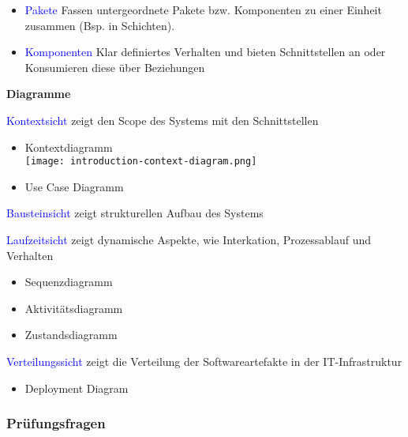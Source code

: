 \begin{itemize}
    \item \textcolor{blue}{Pakete} Fassen untergeordnete Pakete bzw. Komponenten zu einer Einheit zusammen (Bsp. in Schichten).
    \item \textcolor{blue}{Komponenten} Klar definiertes Verhalten und bieten Schnittstellen an oder Konsumieren diese über Beziehungen
\end{itemize}
\vspace{10pt}
\textbf{Diagramme}

\textcolor{blue}{Kontextsicht} zeigt den Scope des Systems mit den Schnittstellen

\begin{itemize}
    \item Kontextdiagramm \\
    \texttt{[image: introduction-context-diagram.png]}
    \item Use Case Diagramm
\end{itemize}

\textcolor{blue}{Bausteinsicht} zeigt strukturellen Aufbau des Systems

\textcolor{blue}{Laufzeitsicht} zeigt dynamische Aspekte, wie Interkation, Prozessablauf und Verhalten

\begin{itemize}
    \item Sequenzdiagramm
    \item Aktivitätsdiagramm
    \item Zustandsdiagramm
\end{itemize}

\textcolor{blue}{Verteilungssicht} zeigt die Verteilung der Softwareartefakte in der IT-Infrastruktur

\begin{itemize}
    \item Deployment Diagram
\end{itemize}

\subsubsection{Prüfungsfragen}


